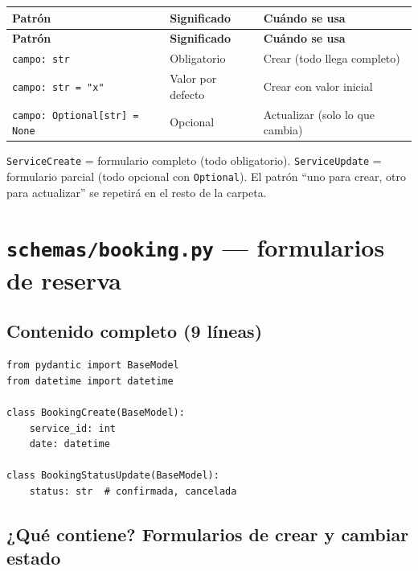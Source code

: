 \documentclass[11pt,a4paper]{article}
\begin{document}
\begin{center}
{\small
\setlength{\tabcolsep}{4pt}
\begin{longtable}{@{}>{\raggedright\arraybackslash}p{4.5cm}>{\raggedright\arraybackslash}p{5.2cm}>{\raggedright\arraybackslash}p{5.2cm}@{}}
\toprule
\textbf{Patrón} & \textbf{Significado} & \textbf{Cuándo se usa} \\
\midrule
\endfirsthead
\toprule
\textbf{Patrón} & \textbf{Significado} & \textbf{Cuándo se usa} \\
\midrule
\endhead
\texttt{campo: str} & Obligatorio & Crear (todo llega completo) \\
\texttt{campo: str = "x"} & Valor por defecto & Crear con valor inicial \\
\texttt{campo: Optional[str] = None} & Opcional & Actualizar (solo lo que cambia) \\
\bottomrule
\end{longtable}
}
\end{center}

\begin{recuadro}
\texttt{ServiceCreate} = formulario completo (todo obligatorio).
\texttt{ServiceUpdate} = formulario parcial (todo opcional con \texttt{Optional}).
El patrón ``uno para crear, otro para actualizar'' se repetirá en el resto de la carpeta.
\end{recuadro}

\section{\texttt{schemas/booking.py} --- formularios de reserva}

\subsection{Contenido completo (9 líneas)}

\begin{lstlisting}
from pydantic import BaseModel
from datetime import datetime

class BookingCreate(BaseModel):
    service_id: int
    date: datetime

class BookingStatusUpdate(BaseModel):
    status: str  # confirmada, cancelada
\end{lstlisting}

\subsection{¿Qué contiene? Formularios de \textbf{crear} y \textbf{cambiar estado}}
\end{document}
